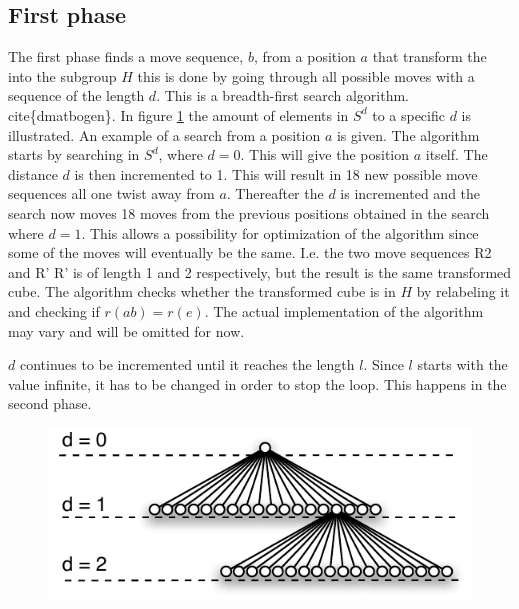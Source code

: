 \subsection{First phase}
\label{sub:firstPhase}
The first phase finds a move sequence, $b$, from a position $a$ that transform the \rubik into the subgroup $H$ this is done by going through all possible moves with a sequence of the length $d$. This is a breadth-first search algorithm.  cite\{dmatbogen\}.
In figure \ref{fig:searchExpansion} the amount of elements in $S^d$ to a specific $d$ is illustrated.
An example of a search from a position $a$ is given. The algorithm starts by searching in $S^{d}$, where $d =  0$. This will give the position $a$ itself. The distance $d$ is then incremented to 1. This will result in 18 new possible move sequences all one twist away from $a$. Thereafter the $d$ is incremented and the search now moves 18 moves from the previous positions obtained in the search where $d = 1$. This allows a possibility for optimization of the algorithm since some of the moves will eventually be the same. I.e. the two move sequences R2 and R' R' is of length 1 and 2 respectively, but the result is the same transformed cube. The algorithm checks whether the transformed cube is in $H$ by relabeling it and checking if $r(ab) = r(e)$. The actual implementation of the algorithm may vary and will be omitted for now.

$d$ continues to be incremented until it reaches the length $l$. Since $l$ starts with the value infinite, it has to be changed in order to stop the loop. This happens in the second phase.

\begin{figure}[!hb]
	\centering
		\includegraphics[scale=0.75]{input/pics/searchExpansion.pdf}
	\caption{}
	\label{fig:searchExpansion}
\end{figure}


